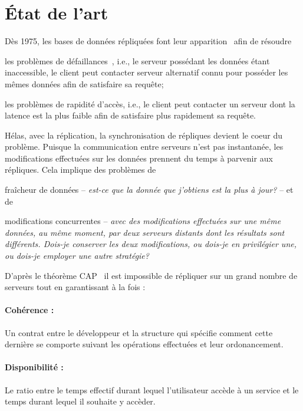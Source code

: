 

\section{État de l'art}
\label{repl:sec:stateoftheart}

Dès 1975, les bases de données répliquées font leur
apparition~\cite{johnson1975maintenance} afin de résoudre
\begin{inparaenum}[(i)]
\item les problèmes de défaillances~\cite{alsberg1976principle}, i.e., le
  serveur possédant les données étant inaccessible, le client peut contacter
  serveur alternatif connu pour posséder les mêmes données afin de satisfaire sa
  requête;
\item les problèmes de rapidité d'accès, i.e., le client peut contacter un
  serveur dont la latence est la plus faible afin de satisfaire plus rapidement
  sa requête.
\end{inparaenum}

Hélas, avec la réplication, la synchronisation de répliques devient le coeur du
problème. Puisque la communication entre serveurs n'est pas instantanée, les
modifications effectuées sur les données prennent du temps à parvenir aux
répliques. Cela implique des problèmes de
\begin{inparaenum}[(i)]
\item fraîcheur de données -- \emph{est-ce que la donnée que j'obtiens est la
    plus à jour?} -- et de
\item modifications concurrentes -- \emph{avec des modifications effectuées sur
    une même données, au même moment, par deux serveurs distants dont les
    résultats sont différents. Dois-je conserver les deux modifications, ou
    dois-je en privilégier une, ou dois-je employer une autre stratégie?}
\end{inparaenum}


D'après le théorème CAP~\cite{gilbert2002brewer} il est impossible de répliquer
sur un grand nombre de serveurs tout en garantissant à la fois :

\paragraph{Cohérence :} Un contrat entre le développeur et la structure qui
spécifie comment cette dernière se comporte suivant les opérations effectuées et
leur ordonancement.

\paragraph{Disponibilité :} Le ratio entre le temps effectif durant lequel
l'utilisateur accède à un service et le temps durant lequel il souhaite y
accèder.

